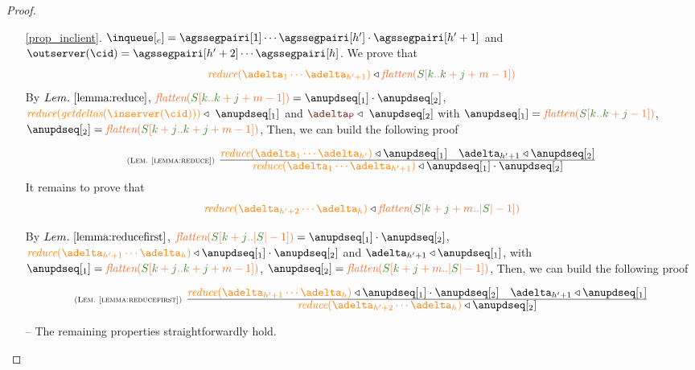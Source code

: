 \begin{proof}
\begin{itemize}
\begin{itemize}
\begin{itemize}
\begin{itemize}
					\item[\ref{prop_inclient}.] ${\inclient} = \agssegpairi[1] \cdots \agssegpairi[h']\cdot\agssegpairi[{h'+1}]$ and $\outserver(\cid) = \agssegpairi[h'+2] \cdots \agssegpairi[h]$. We prove that
					\[\ireduce{\adelta_1\cdots\adelta_{h'+1}}\triangleleft \flatten{ \queuemessage[\tknown..\tknown+\treceivebuffer+m-1]}\]
					By $\lemref{lemma:reduce}$, $\flatten{ \queuemessage[\tknown..\tknown+\treceivebuffer+m-1]} = \anupdseq[_1]\cdot\anupdseq[_2]$, 
						$\ireduce{\igetdeltas{\inserver(\cid)}} \triangleleft \ \anupdseq[_1]$ and $ {\pushbuffer}  \triangleleft \ \anupdseq[_2]$ with
						$\anupdseq[_1] = \flatten{ \queuemessage[\tknown..\tknown+\treceivebuffer-1]}$,
						$\anupdseq[_2] = \flatten{ \queuemessage[\tknown+\treceivebuffer..\tknown+\treceivebuffer+m-1]}$,
						 Then, we can build the following proof 
						 
						\[
						  \mathrulean{\lemref{lemma:reduce}}
						       {\ireduce{\adelta_1\cdots\adelta_{h'}}\triangleleft \anupdseq[_1]
							\quad
							\adelta_{h'+1} \triangleleft \anupdseq[_2]}
  						       {\ireduce{\adelta_1\cdots\adelta_{h'+1}}\triangleleft \anupdseq[_1]\cdot\anupdseq[_2]}  
						\]
					It remains to prove that
					\[\ireduce{\adelta_{h'+2}\cdots\adelta_h}\triangleleft \flatten{\queuemessage[\tknown+\treceivebuffer+m..|\queuemessage| - 1]}\]
					
					
					
					By $\lemref{lemma:reducefirst}$, $\flatten{\queuemessage[\tknown+\treceivebuffer..|\queuemessage| - 1]} = \anupdseq[_1]\cdot\anupdseq[_2]$, 
					$\ireduce{\adelta_{h'+1}\cdots\adelta_h}\triangleleft \anupdseq[_1]\cdot\anupdseq[_2]$ and 
					$\adelta_{h'+1} \triangleleft \anupdseq[_1]$, with 
					$\anupdseq[_1] = \flatten{ \queuemessage[\tknown+\treceivebuffer..\tknown+\treceivebuffer+m-1]}$,
					$\anupdseq[_2] = \flatten{ \queuemessage[\tknown+\treceivebuffer+m .. |\queuemessage| -1]}$,
					Then, we can build the following proof 
						 
					\[
						  \mathrulean{\lemref{lemma:reducefirst}}
						       {\ireduce{\adelta_{h'+1}\cdots\adelta_h}\triangleleft \anupdseq[_1]\cdot\anupdseq[_2]
							\quad
							\adelta_{h'+1} \triangleleft \anupdseq[_1]}
  						       {\ireduce{\adelta_{h'+2}\cdots\adelta_h}\triangleleft \anupdseq[_2]}  
					\]
					

					
						\item[{--}] The remaining properties straightforwardly hold.
							

\end{itemize}
\end{itemize}
\end{itemize}
\end{itemize}
\end{proof}
